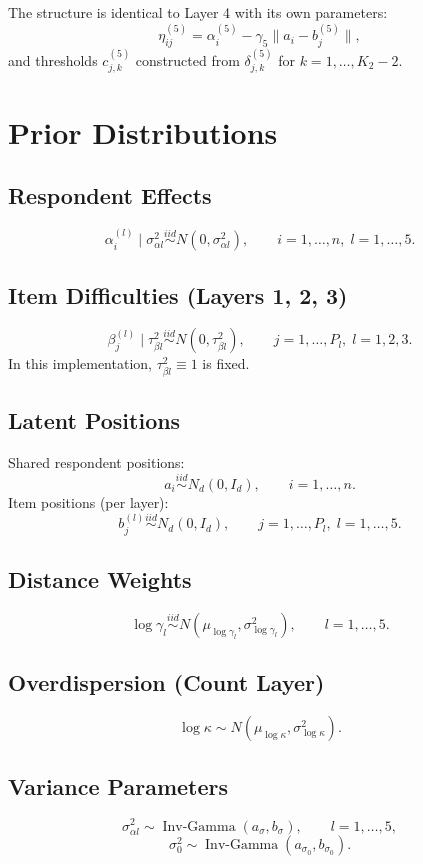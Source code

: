\documentclass[11pt]{article}
\begin{document}
The structure is identical to Layer 4 with its own parameters:
\[
\eta_{ij}^{(5)} = \alpha_i^{(5)} - \gamma_5\|a_i - b_j^{(5)}\|,
\]
and thresholds $c_{j,k}^{(5)}$ constructed from $\delta_{j,k}^{(5)}$ for $k=1,\dots,K_2-2$.

\section{Prior Distributions}

\subsection{Respondent Effects}
\[
\alpha_i^{(l)} \mid \sigma_{\alpha l}^2 \overset{iid}{\sim} N(0,\sigma_{\alpha l}^2),
\qquad i=1,\dots,n,\; l=1,\dots,5.
\]

\subsection{Item Difficulties (Layers 1, 2, 3)}
\[
\beta_j^{(l)} \mid \tau_{\beta l}^2 \overset{iid}{\sim} N(0,\tau_{\beta l}^2),
\qquad j=1,\dots,P_l,\; l=1,2,3.
\]
In this implementation, $\tau_{\beta l}^2 \equiv 1$ is fixed.

\subsection{Latent Positions}
Shared respondent positions:
\[
a_i \overset{iid}{\sim} N_d(0,I_d),
\qquad i=1,\dots,n.
\]
Item positions (per layer):
\[
b_j^{(l)} \overset{iid}{\sim} N_d(0,I_d),
\qquad j=1,\dots,P_l,\; l=1,\dots,5.
\]

\subsection{Distance Weights}
\[
\log \gamma_l \overset{iid}{\sim} N(\mu_{\log \gamma_l},\sigma_{\log \gamma_l}^2),
\qquad l=1,\dots,5.
\]

\subsection{Overdispersion (Count Layer)}
\[
\log \kappa \sim N(\mu_{\log \kappa},\sigma_{\log \kappa}^2).
\]

\subsection{Variance Parameters}
\[
\sigma_{\alpha l}^2 \sim \operatorname{Inv\text{-}Gamma}(a_\sigma,b_\sigma),
\qquad l=1,\dots,5,
\]
\[
\sigma_0^2 \sim \operatorname{Inv\text{-}Gamma}(a_{\sigma_0},b_{\sigma_0}).
\]
\end{document}
